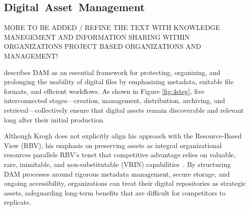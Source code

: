 \documentclass[a4paper,10pt,twocolumn]{article}
\numberwithin{figure}{section}
\numberwithin{table}{section}
\begin{document}



\subsection{\mbox{Digital Asset Management}}
MORE TO BE ADDED / REFINE THE TEXT WITH KNOWLEDGE MANEGEMENT 
AND INFORMATION SHARING WITHIN ORGANIZATIONS 
PROJECT BASED ORGANIZATIONS AND MANAGEMENT!

\cite{krogh2009} describes DAM as an essential framework for protecting, 
organizing, and prolonging the usability of digital files by emphasizing 
metadata, suitable file formats, and efficient workflows. As shown in Figure \ref{fig:4steg}, 
five interconnected stages—creation, management, distribution, archiving, and retrieval—collectively 
ensure that digital assets remain discoverable and relevant long after their initial production.

Although Krogh does not explicitly align his approach with the Resource-Based View (RBV), 
his emphasis on preserving assets as integral organizational resources parallels RBV’s 
tenet that competitive advantage relies on valuable, rare, inimitable, and non-substitutable 
(VRIN) capabilities \citep{barney1991}. By structuring DAM processes around rigorous 
metadata management, secure storage, and ongoing accessibility, organizations can treat 
their digital repositories as strategic assets, safeguarding long-term benefits that are 
difficult for competitors to replicate.
\end{document}
